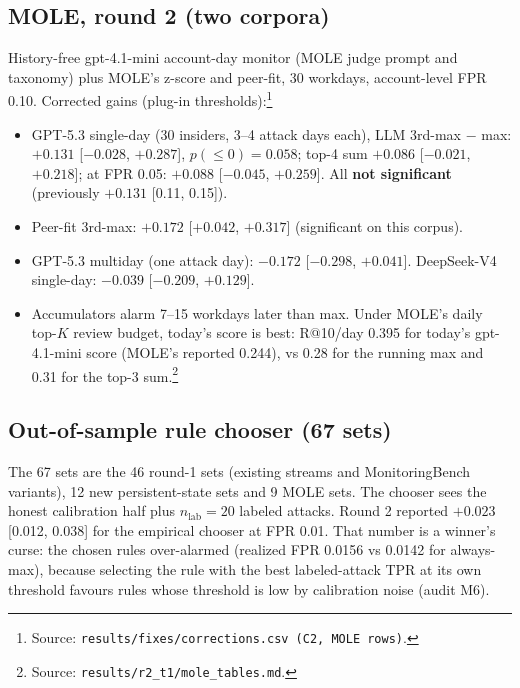 \documentclass[11pt]{article}
\newcommand{\m}{\ensuremath{-}}
\newcommand{\src}[1]{\footnote{Source: \nolinkurl{#1}.}}
\begin{document}
\subsection{MOLE, round 2 (two corpora)}
History-free gpt-4.1-mini account-day monitor (MOLE judge prompt and taxonomy) plus MOLE's z-score and peer-fit, 30 workdays, account-level FPR 0.10. Corrected gains (plug-in thresholds):\src{results/fixes/corrections.csv (C2, MOLE rows)}
\begin{itemize}
\item GPT-5.3 single-day (30 insiders, 3--4 attack days each), LLM 3rd-max $-$ max: $+0.131$ [$\m0.028$, $+0.287$], $p(\le0)=0.058$; top-4 sum $+0.086$ [$\m0.021$, $+0.218$]; at FPR 0.05: $+0.088$ [$\m0.045$, $+0.259$]. All \textbf{not significant} (previously $+0.131$ [0.11, 0.15]).
\item Peer-fit 3rd-max: $+0.172$ [$+0.042$, $+0.317$] (significant on this corpus).
\item GPT-5.3 multiday (one attack day): $\m0.172$ [$\m0.298$, $+0.041$]. DeepSeek-V4 single-day: $\m0.039$ [$\m0.209$, $+0.129$].
\item Accumulators alarm 7--15 workdays later than max. Under MOLE's daily top-$K$ review budget, today's score is best: R@10/day 0.395 for today's gpt-4.1-mini score (MOLE's reported 0.244), vs 0.28 for the running max and 0.31 for the top-3 sum.\src{results/r2_t1/mole_tables.md}
\end{itemize}

\subsection{Out-of-sample rule chooser (67 sets)}
The 67 sets are the 46 round-1 sets (existing streams and MonitoringBench variants), 12 new persistent-state sets and 9 MOLE sets. The chooser sees the honest calibration half plus $n_\text{lab}=20$ labeled attacks. Round 2 reported $+0.023$ [0.012, 0.038] for the empirical chooser at FPR 0.01. That number is a winner's curse: the chosen rules over-alarmed (realized FPR 0.0156 vs 0.0142 for always-max), because selecting the rule with the best labeled-attack TPR at its own threshold favours rules whose threshold is low by calibration noise (audit M6).
\end{document}
